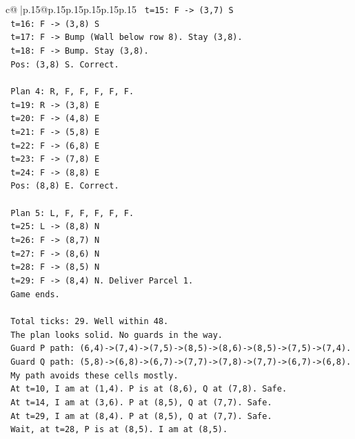 \documentclass{article}
\begin{document}
{\begin{supertabular}{c@{$\;$}|p{.15\linewidth}@{}p{.15\linewidth}p{.15\linewidth}p{.15\linewidth}p{.15\linewidth}p{.15\linewidth}}
{{{\texttt{   t=15: F {-}> (3,7) S} \\
\texttt{   t=16: F {-}> (3,8) S} \\
\texttt{   t=17: F {-}> Bump (Wall below row 8). Stay (3,8).} \\
\texttt{   t=18: F {-}> Bump. Stay (3,8).} \\
\texttt{   Pos: (3,8) S. Correct.} \\
\\ 
\texttt{   Plan 4: R, F, F, F, F, F.} \\
\texttt{   t=19: R {-}> (3,8) E} \\
\texttt{   t=20: F {-}> (4,8) E} \\
\texttt{   t=21: F {-}> (5,8) E} \\
\texttt{   t=22: F {-}> (6,8) E} \\
\texttt{   t=23: F {-}> (7,8) E} \\
\texttt{   t=24: F {-}> (8,8) E} \\
\texttt{   Pos: (8,8) E. Correct.} \\
\\ 
\texttt{   Plan 5: L, F, F, F, F, F.} \\
\texttt{   t=25: L {-}> (8,8) N} \\
\texttt{   t=26: F {-}> (8,7) N} \\
\texttt{   t=27: F {-}> (8,6) N} \\
\texttt{   t=28: F {-}> (8,5) N} \\
\texttt{   t=29: F {-}> (8,4) N. Deliver Parcel 1.} \\
\texttt{   Game ends.} \\
\\ 
\texttt{   Total ticks: 29. Well within 48.} \\
\texttt{   The plan looks solid. No guards in the way.} \\
\texttt{   Guard P path: (6,4){-}>(7,4){-}>(7,5){-}>(8,5){-}>(8,6){-}>(8,5){-}>(7,5){-}>(7,4).} \\
\texttt{   Guard Q path: (5,8){-}>(6,8){-}>(6,7){-}>(7,7){-}>(7,8){-}>(7,7){-}>(6,7){-}>(6,8).} \\
\texttt{   My path avoids these cells mostly.} \\
\texttt{   At t=10, I am at (1,4). P is at (8,6), Q at (7,8). Safe.} \\
\texttt{   At t=14, I am at (3,6). P at (8,5), Q at (7,7). Safe.} \\
\texttt{   At t=29, I am at (8,4). P at (8,5), Q at (7,7). Safe.} \\
\texttt{   Wait, at t=28, P is at (8,5). I am at (8,5).} \\
}}}
\end{supertabular}}
\end{document}

